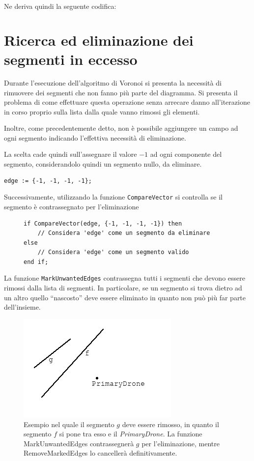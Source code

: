 \documentclass[11pt,a4paper]{report}
\newcommand{\modelicaclass}[1]{
	
}
\newcommand{\name}[1]{{\ttfamily #1}}
\begin{document}
Ne deriva quindi la seguente codifica:

\modelicaclass{CenterOfMass.mo}

\section{Ricerca ed eliminazione dei segmenti in eccesso}

Durante l'esecuzione dell'algoritmo di Voronoi si presenta la necessità di rimuovere dei segmenti che non fanno più parte del diagramma. Si presenta il problema di come effettuare questa operazione senza arrecare danno all'iterazione in corso proprio sulla lista dalla quale vanno rimossi gli elementi.

Inoltre, come precedentemente detto, non è possibile aggiungere un campo ad ogni segmento indicando l'effettiva necessità di eliminazione.

La scelta cade quindi sull'assegnare il valore $-1$ ad ogni componente del segmento, considerandolo quindi un segmento nullo, da eliminare.

\begin{lstlisting}[language=Modelica]
edge := {-1, -1, -1, -1};
\end{lstlisting}

Successivamente, utilizzando la funzione \verb|CompareVector| si controlla se il segmento è contrassegnato per l'eliminazione

\begin{figure}[H]
\begin{lstlisting}
if CompareVector(edge, {-1, -1, -1, -1}) then
	// Considera 'edge' come un segmento da eliminare
else
	// Considera 'edge' come un segmento valido
end if;
\end{lstlisting}
\end{figure}

La funzione \verb|MarkUnwantedEdges| contrassegna tutti i segmenti che devono essere rimossi dalla lista di segmenti. In particolare, se un segmento si trova dietro ad un altro quello ``nascosto'' deve essere eliminato in quanto non può più far parte dell'insieme.

\label{mark_unwanted_edges}

\begin{figure}[H]
\centering
\includegraphics[scale=0.7]{rimozione_segmento.png}
\caption{Esempio nel quale il segmento $g$ deve essere rimosso, in quanto il segmento $f$ si pone tra esso e il \textit{PrimaryDrone}. La funzione \name{MarkUnwantedEdges} contrassegnerà $g$ per l'eliminazione, mentre \name{RemoveMarkedEdges} lo cancellerà definitivamente.}
\end{figure}
\end{document}
